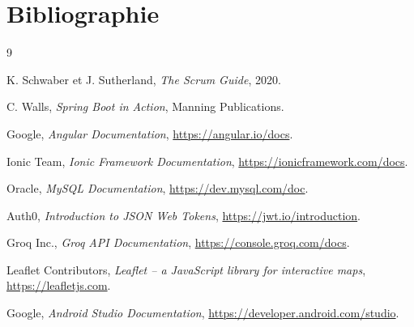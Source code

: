 \documentclass[12pt,a4paper,oneside]{report}
\begin{document}
\chapter*{Bibliographie}

\begin{thebibliography}{9}

K. Schwaber et J. Sutherland, \textit{The Scrum Guide}, 2020.

C. Walls, \textit{Spring Boot in Action}, Manning Publications.

Google, \textit{Angular Documentation}, \url{https://angular.io/docs}.

Ionic Team, \textit{Ionic Framework Documentation}, \url{https://ionicframework.com/docs}.

Oracle, \textit{MySQL Documentation}, \url{https://dev.mysql.com/doc}.

Auth0, \textit{Introduction to JSON Web Tokens}, \url{https://jwt.io/introduction}.

Groq Inc., \textit{Groq API Documentation}, \url{https://console.groq.com/docs}.

Leaflet Contributors, \textit{Leaflet -- a JavaScript library for interactive maps}, \url{https://leafletjs.com}.

Google, \textit{Android Studio Documentation}, \url{https://developer.android.com/studio}.

\end{thebibliography}
\end{document}
